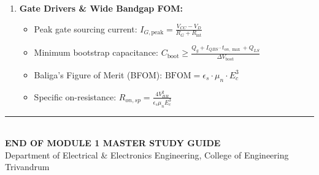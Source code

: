 \documentclass[11pt,a4paper]{article}
\begin{document}
\begin{formulabox}
\begin{enumerate}[leftmargin=*,itemsep=1.5pt,topsep=1pt,parsep=0pt]
  \item \textbf{Gate Drivers \& Wide Bandgap FOM:}
  \begin{itemize}
    \item Peak gate sourcing current: $I_{G,\text{peak}} = \frac{V_{CC} - V_D}{R_G + R_{\text{int}}}$
    \item Minimum bootstrap capacitance: $C_{\text{boot}} \ge \frac{Q_g + I_{QBS} \cdot t_{on,\max} + Q_{LS}}{\Delta V_{\text{boot}}}$
    \item Baliga's Figure of Merit (BFOM): $\text{BFOM} = \epsilon_s \cdot \mu_n \cdot E_c^3$
    \item Specific on-resistance: $R_{on,sp} = \frac{4 V_{BR}^2}{\epsilon_s \mu_n E_c^3}$
  \end{itemize}
\end{enumerate}
\end{formulabox}

\vspace{1.5em}
\begin{center}
  \textcolor{accentblue}{\rule{0.6\textwidth}{1.0pt}}\\[0.8ex]
  {\small\bfseries\color{navyprimary} END OF MODULE 1 MASTER STUDY GUIDE}\\[0.3ex]
  {\footnotesize\color{gray} Department of Electrical \& Electronics Engineering, College of Engineering Trivandrum}
\end{center}
\end{document}
